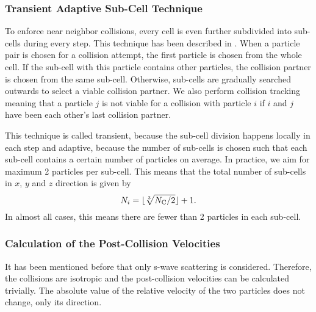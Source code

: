 \subsubsection*{Transient Adaptive Sub-Cell Technique}
To enforce near neighbor collisions, every cell is even further subdivided into sub-cells during every step. This technique has been described in \cite{SU20101136}. When a particle pair is chosen for a collision attempt, the first particle is chosen from the whole cell. If the sub-cell with this particle contains other particles, the collision partner is chosen from the same sub-cell. Otherwise, sub-cells are gradually searched outwards to select a viable collision partner. We also perform collision tracking meaning that a particle $j$ is not viable for a collision with particle $i$ if $i$ and $j$ have been each other's last collision partner.

This technique is called transient, because the sub-cell division happens locally in each step and adaptive, because the number of sub-cells is chosen such that each sub-cell contains a certain number of particles on average. In practice, we aim for maximum 2 particles per sub-cell. This means that the total number of sub-cells in $x$, $y$ and $z$ direction is given by
\begin{equation} \label{eq:tas_ncells}
    N_i = \lfloor\sqrt[3]{N_\text{C} / 2}\rfloor + 1.
\end{equation}
In almost all cases, this means there are fewer than 2 particles in each sub-cell.

\subsubsection*{Calculation of the Post-Collision Velocities}
It has been mentioned before that only s-wave scattering is considered. Therefore, the collisions are isotropic and the post-collision velocities can be calculated trivially. The absolute value of the relative velocity of the two particles does not change, only its direction.

